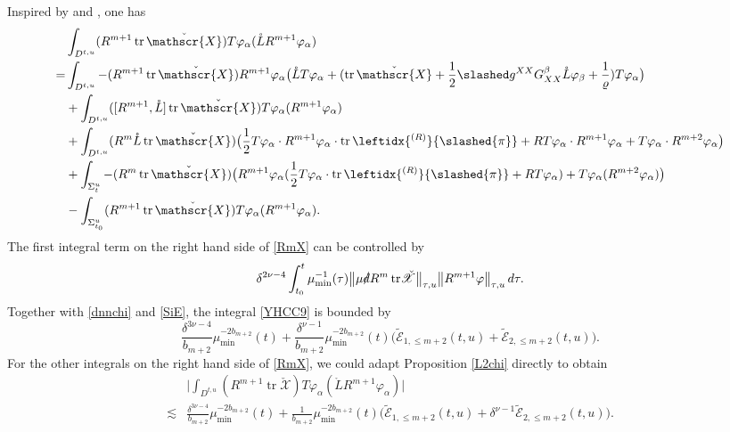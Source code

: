 \documentclass[11pt,twoside]{article}
\def\al{\alpha}
\def\vp{\varphi}
\def\f{\frac}
\begin{document}
\begin{enumerate}
Inspired by \cite[Section 9.2]{M-Y} and \cite[Section 7.2]{L-Y}, one has
\begin{align}\label{RmX}
&\int_{D^{t,u}}(R^{m+1}\operatorname{tr}\check{\mathscr{X}})T\vp_\al(\mathring LR^{m+1}\vp_\al)\notag\\
= &\int_{D^{t,u}}-(R^{m+1}\operatorname{tr}\check{\mathscr{X}})R^{m+1}\vp_\al\big(\mathring LT\vp_\al+(\operatorname{tr}\check{\mathscr{X}}+\f12\slashed g^{XX}G_{XX}^\beta\mathring L\vp_\beta+\f1\varrho)T\vp_\al\big)\notag\\
&+\int_{D^{t,u}}([R^{m+1},\mathring L]\operatorname{tr}\check{\mathscr{X}})T\vp_\al(R^{m+1}\vp_\al)\\
&+\int_{D^{t, u}}(R^m\mathring L\operatorname{tr}\check{\mathscr{X}})\big(\f12T\vp_\al\cdot R^{m+1}\vp_\al\cdot\operatorname{tr}\leftidx{^{(R)}}{\slashed{\pi}}+RT\vp_\al\cdot R^{m+1}\vp_{\al}+T\vp_\al\cdot R^{m+2}\vp_\al\big)\notag\\
&+\int_{\Sigma_t^u}-(R^m\operatorname{tr}\check{\mathscr{X}})\big(R^{m+1}\vp_\al(\f12T\vp_\al\cdot\operatorname{tr}\leftidx{^{(R)}}{\slashed{\pi}}
+RT\vp_\al)+T\vp_\al(R^{m+2}\vp_\al)\big)\notag\\
&-\int_{\Sigma_{t_0}^u}(R^{m+1}\operatorname{tr}\check{\mathscr{X}})T\vp_\al(R^{m+1}\vp_\al).\notag
\end{align}
The first integral term on the right hand side of \eqref{RmX} can be controlled by
\begin{equation}\label{YHCC9}
\delta^{2\nu-4} \int_{t_0}^t \mu_{\min}^{-1}(\tau) \bigl\| \mu \slashed{d} R^m \, \mathrm{tr}\check{\mathscr{X}} \bigr\|_{\tau,u} \bigl\| R^{m+1} \vp \bigr\|_{\tau,u} \, d\tau.
\end{equation}
Together with \eqref{dnnchi} and \eqref{SiE}, the integral \eqref{YHCC9} is bounded by
\[
\frac{\delta^{3\nu-4}}{b_{m+2}} \mu_{\min}^{-2b_{m+2}}(t) + \frac{\delta^{\nu-1}}{b_{m+2}} \mu_{\min}^{-2b_{m+2}}(t)
\big( \widetilde{\mathcal{E}}_{1,\leq m+2}(t,u) + \widetilde{\mathcal{E}}_{2,\leq m+2}(t,u)\big).
\]
For the other integrals on the right hand side of \eqref{RmX}, we could adapt Proposition \ref{L2chi} directly to obtain
\begin{equation}\label{topX}
\begin{split}
&\big|\int_{D^{t,u}}(R^{m+1}\operatorname{tr}\check{\mathscr{X}})T\vp_\al(\mathring LR^{m+1}\vp_\al)\big|\\
\lesssim&\frac{\delta^{3\nu-4}}{b_{m+2}} \mu_{\min}^{-2b_{m+2}}(t) + \frac{1}{b_{m+2}} \mu_{\min}^{-2b_{m+2}}(t) \big( \widetilde{\mathcal{E}}_{1,\leq m+2}(t,u) +\delta^{\nu-1} \widetilde{\mathcal{E}}_{2,\leq m+2}(t,u) \big).
\end{split}
\end{equation}


\end{enumerate}
\end{document}
